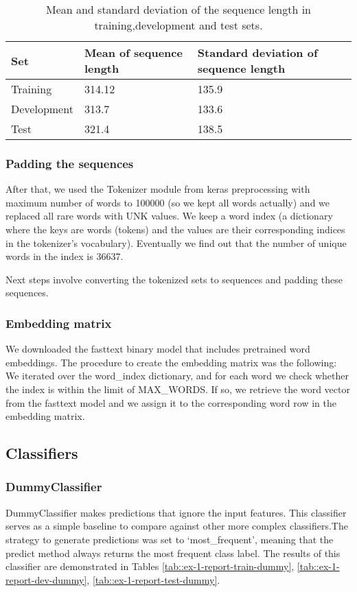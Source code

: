 \documentclass[10pt, a4paper]{article}
\begin{document}
	\begin{table}
		\begin{tabular}{|l|l|l|}
			\hline
			\cellcolor{blue!25}\textbf{Set} & \cellcolor{blue!25}\textbf{Mean of sequence length} &
			\cellcolor{blue!25}\textbf{Standard deviation of sequence length}\\
			\hline
			Training & 314.12 & 135.9 \\\hline
			Development & 313.7  & 133.6 \\\hline
			Test & 321.4 & 138.5 \\\hline
		\end{tabular}
		\centering
		\caption{Mean and standard deviation of the sequence length in training,development and test sets.}
		\label{tab::ex-1-stats}
	\end{table}
	
	
	
	\subsubsection{Padding the sequences}
	After that, we used the Tokenizer module from keras preprocessing with maximum number of words to 100000 (so we kept all words actually) and we replaced all rare words with UNK values. We keep a word index (a dictionary where the keys are words (tokens) and the values are their corresponding indices in the tokenizer's vocabulary). Eventually we find out that the number of unique words in the index is 36637.
	
	Next steps involve converting the tokenized sets to sequences and padding these sequences.
	
	\subsubsection{Embedding matrix}
	We downloaded the fasttext binary model that includes pretrained word embeddings. The procedure to create the embedding matrix was the following: We iterated over the word\_index dictionary, and for each word we check whether the index is within the limit of MAX\_WORDS. If so, we retrieve the word vector from the fasttext model and we assign it to the corresponding word row in the embedding matrix.
	
	
	\subsection{Classifiers}
	\subsubsection{DummyClassifier}
	DummyClassifier makes predictions that ignore the input features. This classifier serves as a simple baseline to compare against other more complex classifiers.The strategy to generate predictions was set to ‘most\_frequent’,  meaning that the predict method always returns the most frequent class label. The results of this classifier are demonstrated in Tables  \ref{tab::ex-1-report-train-dummy}, \ref{tab::ex-1-report-dev-dummy}, \ref{tab::ex-1-report-test-dummy}.
	
\end{document}
